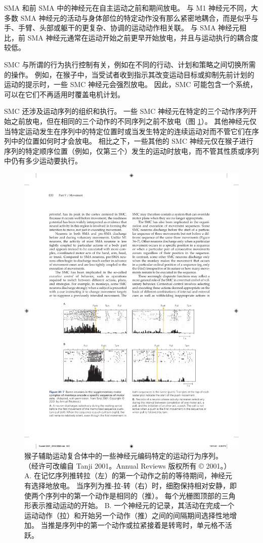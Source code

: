 SMA 和前 SMA 中的神经元在自主运动之前和期间放电。 与 M1 神经元不同，大多数 SMA 神经元的活动与身体部位的特定动作没有那么紧密地耦合，而是似乎与手、手臂、头部或躯干的更复杂、协调的运动动作相关联。 与 SMA 神经元相比，前 SMA 神经元通常在运动开始之前更早开始放电，并且与运动执行的耦合度较低。

SMC 与所谓的行为执行控制有关，例如在不同的行动、计划和策略之间切换所需的操作。 例如，在猴子中，当受试者收到指示其改变运动目标或抑制先前计划的运动的提示时，一些 SMC 神经元会强烈放电。 因此，SMC 可能包含一个系统，可以在它们不再适用时覆盖电机计划。

SMC 还涉及运动序列的组织和执行。 
一些 SMC 神经元在特定的三个动作序列开始之前放电，但在相同的三个动作的不同序列之前不放电（图 \ref{fig:34_7}）。
其他神经元仅当特定运动发生在序列中的特定位置时或当发生特定的连续运动对而不管它们在序列中的位置如何时才会放电。 相比之下，一些其他的 SMC 神经元仅在猴子进行序列的特定顺序位置（例如，仅第三个）发生的运动时放电，而不管其性质或序列中仍有多少运动要执行。

\begin{figure}[htbp]
	\centering
	\includegraphics[width=0.8\linewidth]{chap34/fig_34_7}
	\caption{猴子辅助运动复合体中的一些神经元编码特定的运动行为序列。 （经许可改编自 Tanji 2001。Annual Reviews 版权所有 © 2001。） A. 在记忆序列推转拉（左）的第一个动作之前的等待期间，神经元有选择地放电。 当序列为推-拉-转（右）时，细胞保持相对安静，即使两个序列中的第一个动作是相同的（推）。 每个光栅图顶部的三角形表示推动运动的开始。 B. 一个神经元的记录，其活动在完成一个运动动作（拉）和开始另一个动作（推）之间的间隔期间选择性地增加。 当推是序列中的第一个动作或拉紧接着是转弯时，单元格不活跃。}
	\label{fig:34_7}
\end{figure}

